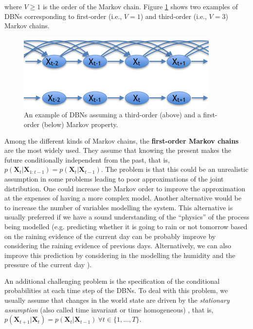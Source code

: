 \noindent where $V\geq 1$ is the order of the Markov chain. Figure \ref{Figure:markovChain} shows two examples of DBNs corresponding to first-order (i.e., $V=1$) and third-order (i.e., $V=3$) Markov chains. 

\begin{figure}[ht!]
\begin{center}
\includegraphics[scale=0.56]{./figures/PreliminariesMarkovChain}
\caption{\label{Figure:markovChain} An example of DBNs assuming a third-order (above) and a first-order (below) Markov property.
}
\end{center}
\end{figure}

Among the different kinds of Markov chains, the \textbf{first-order Markov chains} are the most widely used. They assume that knowing the present makes the future conditionally independent from the past, that is, $p(\bm X_t| \bm X_{1:t-1})  = p(\bm X_t|\bm X_{t-1})$. The problem is that this could be an unrealistic assumption in some problems leading to poor approximations of the joint distribution. One could increase the Markov order to improve the approximation at the expenses of having a more complex model. Another  alternative \cite{russelNorvig2009} would be to increase the number of variables modelling the system. This alternative is usually preferred if we have a sound understanding of the ``physics''  of the process being modelled (e.g. predicting whether it is going to rain or not tomorrow based on the raining evidence of the current day can be probably improve by considering the raining evidence of previous days. Alternatively, we can also improve this prediction by considering in the modelling the humidity and the pressure of the current day \cite{russelNorvig2009}). 

An additional challenging problem is the specification of the conditional probabilities at each time step of the DBNs. To deal with this problem, we usually assume that changes in the world state are driven by the \textit{stationary assumption} (also called time invariant or time homogeneous) , that is, $p(\bm X_{t+1}|\bm X_{t}) = p(\bm X_t|\bm X_{t-1})\ \forall t \in\{1,\ldots,T\}$. 

